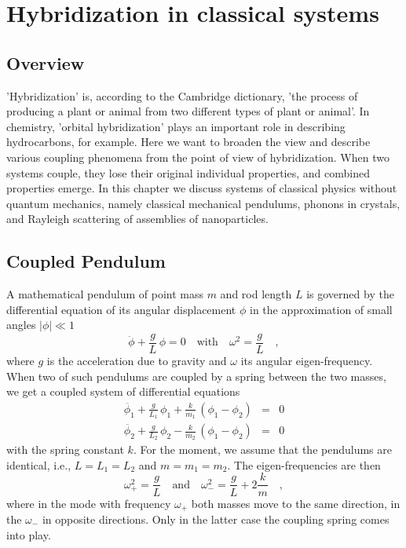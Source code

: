 \renewcommand{\chapterauthors}{Markus Lippitz}
\renewcommand{\lastmod}{November 8, 2023}


\chapter{Hybridization in classical systems}
\label{chap:hybrid_classic}

\section{Overview}


'Hybridization' is, according to the Cambridge dictionary, 'the process of producing a plant or animal from two different types of plant or animal'. In chemistry, 'orbital hybridization' plays an important role in describing hydrocarbons, for example. Here we want to broaden the view and describe various coupling phenomena from the point of view of hybridization. When two systems couple, they lose their original individual properties, and combined properties emerge. In this chapter we discuss systems of classical physics without quantum mechanics, namely classical mechanical pendulums, phonons in crystals, and Rayleigh scattering of assemblies of nanoparticles.


\section{Coupled Pendulum}

A mathematical pendulum of point mass $m$ and rod length $L$ is governed by the differential equation of its angular displacement $\phi$ in the approximation of small angles $|\phi| \ll 1$
\begin{equation}
 \ddot{\phi} + \frac{g}{L} \, \phi = 0 \quad \text{with} \quad \omega^2 = \frac{g}{L}  \quad , 
\end{equation}
where $g$ is the acceleration due to gravity and $\omega$ its angular eigen-frequency. When two of such pendulums are coupled by a spring between the two masses, we get a coupled system of differential equations
\begin{eqnarray}
 \ddot{\phi_1} + \frac{g}{L_1} \, \phi_1 + \frac{k}{m_1} \, \left( \phi_1 - \phi_2 \right) & = & 0 \\
 \ddot{\phi_2} + \frac{g}{L_2} \, \phi_2 - \frac{k}{m_2} \, \left( \phi_1 - \phi_2 \right) & = & 0 
\end{eqnarray}
with the spring constant $k$.  For the moment, we assume that the pendulums are identical, i.e., $L = L_1 = L_2$ and $m = m_1 =m_2$. The eigen-frequencies are then
\begin{equation}
 \omega_{+}^2 = \frac{g}{L} \quad \text{and} \quad 
  \omega_{-}^2 = \frac{g}{L} + 2 \frac{k}{m} \quad ,
\end{equation}
where in the mode with frequency $\omega_{+}$ both masses move to the same direction, in the $\omega_{-}$ in opposite directions. Only in the latter case the coupling spring comes into play.

